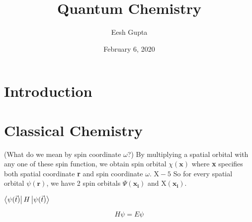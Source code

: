 \documentclass{article}
\title{Quantum Chemistry}
\author{Eesh Gupta }
\date{February 6, 2020}
\newcommand\Chi{\mathrm{X}}
\begin{document}
\maketitle
\tableofcontents
\newpage
\section{Introduction}
\section{Classical Chemistry}



(What do we mean by spin coordinate \(\omega\)?)
By multiplying a spatial orbital with any one of these spin function, we
obtain spin orbital \(\chi(\textbf{x})\) where \textbf{x} specifies both spatial
coordinate \textbf{r} and spin coordinate \(\omega\).
\(\Chi - 5\)
So for every spatial orbital \(\psi(\textbf{r})\), we have 2 spin
orbitals \(\Psi(\mathbf{x_i})\) and \(\Chi(\mathbf{x_i}).\)


\(\bra{\psi(\vec{t})}H\ket{\psi(\vec{t})}\)

\[H\psi = E\psi\]
\end{document}
